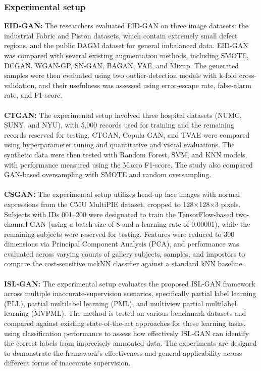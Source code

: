 \documentclass[12pt,a4paper]{article}
\begin{document}
\subsubsection{Experimental setup}
\textbf{EID-GAN:} The researchers evaluated EID-GAN on three image datasets: the industrial Fabric and Piston datasets, which contain extremely small defect regions, and the public DAGM dataset for general imbalanced data. EID-GAN was compared with several existing augmentation methods, including SMOTE, DCGAN, WGAN-GP, SN-GAN, BAGAN, VAE, and Mixup. The generated samples were then evaluated using two outlier-detection models with k-fold cross-validation, and their usefulness was assessed using error-escape rate, false-alarm rate, and F1-score. \\
\\ \textbf{CTGAN:} The experimental setup involved three hospital datasets (NUMC, SUNY, and NYU), with 5,000 records used for training and the remaining records reserved for testing. CTGAN, Copula GAN, and TVAE were compared using hyperparameter tuning and quantitative and visual evaluations. The synthetic data were then tested with Random Forest, SVM, and KNN models, with performance measured using the Macro F1-score. The study also compared GAN-based oversampling with SMOTE and random oversampling. \\
\\ \textbf{CSGAN:} The experimental setup utilizes head-up face images with normal expressions from the CMU MultiPIE dataset, cropped to 128×128×3 pixels. Subjects with IDs 001–200 were designated to train the TensorFlow-based two-channel GAN (using a batch size of 8 and a learning rate of 0.00001), while the remaining subjects were reserved for testing. Features were reduced to 300 dimensions via Principal Component Analysis (PCA), and performance was evaluated across varying counts of gallery subjects, samples, and impostors to compare the cost-sensitive mckNN classifier against a standard kNN baseline. \\
\\ \textbf{ISL-GAN:} The experimental setup evaluates the proposed ISL-GAN framework across multiple inaccurate-supervision scenarios, specifically partial label learning (PLL), partial multilabel learning (PML), and multiview partial multilabel learning (MVPML). The method is tested on various benchmark datasets and compared against existing state-of-the-art approaches for these learning tasks, using classification performance to assess how effectively ISL-GAN can identify the correct labels from imprecisely annotated data. The experiments are designed to demonstrate the framework’s effectiveness and general applicability across different forms of inaccurate supervision.
\end{document}
